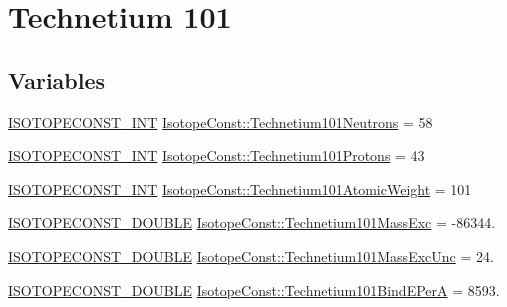 \hypertarget{group___isotope_const-_technetium-_tc101}{}\section{Technetium 101}
\label{group___isotope_const-_technetium-_tc101}
\subsection*{Variables}
\begin{DoxyCompactItemize}
\item 
\mbox{\hyperlink{group___isotope_const-_macros_ga5f18360b3e99483a35c32d789e62621c}{I\+S\+O\+T\+O\+P\+E\+C\+O\+N\+S\+T\+\_\+\+I\+NT}} \mbox{\hyperlink{group___isotope_const-_technetium-_tc101_ga141b89b8c94f0f05c85519a392896c28}{Isotope\+Const\+::\+Technetium101\+Neutrons}} = 58
\item 
\mbox{\hyperlink{group___isotope_const-_macros_ga5f18360b3e99483a35c32d789e62621c}{I\+S\+O\+T\+O\+P\+E\+C\+O\+N\+S\+T\+\_\+\+I\+NT}} \mbox{\hyperlink{group___isotope_const-_technetium-_tc101_ga99bbdac8bb05a21e6c09ed74a7cd2f8b}{Isotope\+Const\+::\+Technetium101\+Protons}} = 43
\item 
\mbox{\hyperlink{group___isotope_const-_macros_ga5f18360b3e99483a35c32d789e62621c}{I\+S\+O\+T\+O\+P\+E\+C\+O\+N\+S\+T\+\_\+\+I\+NT}} \mbox{\hyperlink{group___isotope_const-_technetium-_tc101_gaa4cef41029bc65f91b25e1aff48a8e3a}{Isotope\+Const\+::\+Technetium101\+Atomic\+Weight}} = 101
\item 
\mbox{\hyperlink{group___isotope_const-_macros_ga8f45a7272ce02c0b4c65c44636ed719a}{I\+S\+O\+T\+O\+P\+E\+C\+O\+N\+S\+T\+\_\+\+D\+O\+U\+B\+LE}} \mbox{\hyperlink{group___isotope_const-_technetium-_tc101_ga6d3ffecb53132d56d8fda6e4e94fcbc8}{Isotope\+Const\+::\+Technetium101\+Mass\+Exc}} = -\/86344.
\item 
\mbox{\hyperlink{group___isotope_const-_macros_ga8f45a7272ce02c0b4c65c44636ed719a}{I\+S\+O\+T\+O\+P\+E\+C\+O\+N\+S\+T\+\_\+\+D\+O\+U\+B\+LE}} \mbox{\hyperlink{group___isotope_const-_technetium-_tc101_gaf64ca18ecb8792731012807441da9bbf}{Isotope\+Const\+::\+Technetium101\+Mass\+Exc\+Unc}} = 24.
\item 
\mbox{\hyperlink{group___isotope_const-_macros_ga8f45a7272ce02c0b4c65c44636ed719a}{I\+S\+O\+T\+O\+P\+E\+C\+O\+N\+S\+T\+\_\+\+D\+O\+U\+B\+LE}} \mbox{\hyperlink{group___isotope_const-_technetium-_tc101_ga1535444c652999706285b7ca87a2b0d0}{Isotope\+Const\+::\+Technetium101\+Bind\+E\+PerA}} = 8593.

\end{DoxyCompactItemize}
